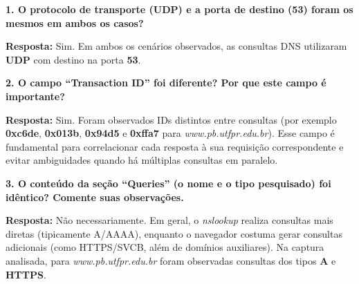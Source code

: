 \documentclass[12pt,a4paper]{article}
\newcommand{\resposta}[1]{\textbf{Resposta:} #1}
\begin{document}
\noindent\textbf{1. O protocolo de transporte (UDP) e a porta de destino (53) foram os mesmos em ambos os casos?}

\resposta{Sim. Em ambos os cenários observados, as consultas DNS utilizaram \textbf{UDP} com destino na porta \textbf{53}.}

\vspace{0.8em}
\noindent\textbf{2. O campo ``Transaction ID'' foi diferente? Por que este campo é importante?}

\resposta{Sim. Foram observados IDs distintos entre consultas (por exemplo \textbf{0xc6de}, \textbf{0x013b}, \textbf{0x94d5} e \textbf{0xffa7} para \textit{www.pb.utfpr.edu.br}). Esse campo é fundamental para correlacionar cada resposta à sua requisição correspondente e evitar ambiguidades quando há múltiplas consultas em paralelo.}

\vspace{0.8em}
\noindent\textbf{3. O conteúdo da seção ``Queries'' (o nome e o tipo pesquisado) foi idêntico? Comente suas observações.}

\resposta{Não necessariamente. Em geral, o \textit{nslookup} realiza consultas mais diretas (tipicamente A/AAAA), enquanto o navegador costuma gerar consultas adicionais (como HTTPS/SVCB, além de domínios auxiliares). Na captura analisada, para \textit{www.pb.utfpr.edu.br} foram observadas consultas dos tipos \textbf{A} e \textbf{HTTPS}.}
\end{document}
